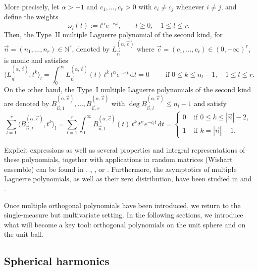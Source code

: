 \documentclass[a4paper]{article}
\theoremstyle{plain}
\theoremstyle{definition}
\newcommand{\NN}{\mathbb{N}}
\newcommand{\dr}{\mathrm{d}}
\begin{document}
More precisely, let $\alpha>-1$ and $c_1,\dots,c_r>0$ with $c_i\neq c_j$ whenever $i\neq j$, and define the weights \cite[Section 3.6.2]{VA20}
$$
\omega_l(t):= t^\alpha e^{-c_l t},\qquad t\geq 0, \quad 1\leq l\leq r.
$$
Then, the Type~II multiple Laguerre polynomial of the second kind, for $\vec n=(n_1,\dots,n_r)\in\NN^r$, denoted by $L^{(\alpha,\vec c)}_{\vec n}$ where $\vec c =(c_1,\dots,c_r)\in(0,+\infty)^r$, is monic and satisfies
\begin{equation}\label{eq:mop-Laguerre-type-ii-1-var}
\langle L^{(\alpha,\vec c)}_{\vec n}, t^k\rangle_l = \int_0^{\infty} L^{(\alpha,\vec c)}_{\vec n}(t) \, t^k \, t^\alpha e^{-c_l t}\, \dr t =0\qquad \text{ if }0\leq k\leq n_l-1, \quad 1\leq l\leq r.
\end{equation}
On the other hand, the Type~I multiple Laguerre polynomials of the second kind are denoted by $B^{(\alpha,\vec c)}_{\vec n,1},\dots,B^{(\alpha,\vec c)}_{\vec n,r}$ with $\deg B^{(\alpha,\vec c)}_{\vec n,l}\leq n_l-1$ and satisfy
\begin{equation}\label{eq:mop-Laguerre-type-i-1-var}
    \sum_{l=1}^r \langle B^{(\alpha,\vec c)}_{\vec n,l}, t^k \rangle_l = \sum_{l=1}^r \int_0^\infty B^{(\alpha,\vec c)}_{\vec n,l}(t) \, t^k \, t^\alpha e^{-c_l t}\, \dr t = \begin{cases}
        0 & \text{ if } 0\leq k\leq |\vec n|-2,\\
        1  & \text{ if } k= |\vec n|-1.
    \end{cases}
\end{equation}


Explicit expressions as well as several properties and integral representations of these polynomials, together with applications in random matrices (Wishart ensemble) can be found in \cite{ABVA03}, \cite{BK05}, \cite[Section 23.4.2]{Ism05}, or \cite[Section 3.6.2]{VA20}. Furthermore, the asymptotics of multiple Laguerre polynomials, as well as their zero distribution, have been studied in \cite{LW08} and \cite{NVA16}.

Once multiple orthogonal polynomials have been introduced, we return to the single-measure but multivariate setting. In the following sections, we introduce what will become a key tool: orthogonal polynomials on the unit sphere and on the unit ball.



\subsection{Spherical harmonics}
\end{document}
